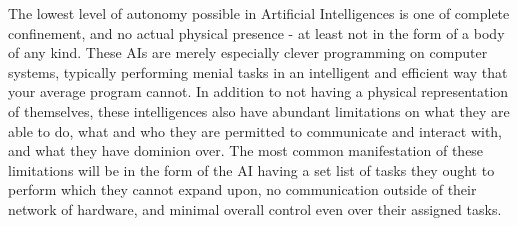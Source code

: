 The lowest level of autonomy possible in Artificial Intelligences is one of complete confinement, and no actual physical presence - at least not in the form of a body of any kind. These AIs are merely especially clever programming on computer systems, typically performing menial tasks in an intelligent and efficient way that your average program cannot. In addition to not having a physical representation of themselves, these intelligences also have abundant limitations on what they are able to do, what and who they are permitted to communicate and interact with, and what they have dominion over. The most common manifestation of these limitations will be in the form of the AI having a set list of tasks they ought to perform which they cannot expand upon, no communication outside of their network of hardware, and minimal overall control even over their assigned tasks.